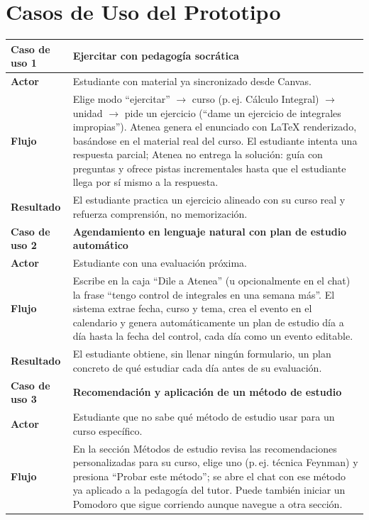 \documentclass[11pt,a4paper]{article}
\begin{document}
\section{Casos de Uso del Prototipo}

\begin{longtable}{@{}>{\bfseries}p{3.6cm} p{11cm}@{}}
\toprule
\textbf{Caso de uso 1} & \textbf{Ejercitar con pedagog\'ia socr\'atica} \\
\midrule
Actor & Estudiante con material ya sincronizado desde Canvas. \\
Flujo & Elige modo ``ejercitar'' $\rightarrow$ curso (p.\,ej. C\'alculo Integral) $\rightarrow$ unidad $\rightarrow$ pide un ejercicio (``dame un ejercicio de integrales impropias''). Atenea genera el enunciado con LaTeX renderizado, bas\'andose en el material real del curso. El estudiante intenta una respuesta parcial; Atenea no entrega la soluci\'on: gu\'ia con preguntas y ofrece pistas incrementales hasta que el estudiante llega por s\'i mismo a la respuesta. \\
Resultado & El estudiante practica un ejercicio alineado con su curso real y refuerza comprensi\'on, no memorizaci\'on. \\
\midrule
\textbf{Caso de uso 2} & \textbf{Agendamiento en lenguaje natural con plan de estudio autom\'atico} \\
\midrule
Actor & Estudiante con una evaluaci\'on pr\'oxima. \\
Flujo & Escribe en la caja ``Dile a Atenea'' (u opcionalmente en el chat) la frase ``tengo control de integrales en una semana m\'as''. El sistema extrae fecha, curso y tema, crea el evento en el calendario y genera autom\'aticamente un plan de estudio d\'ia a d\'ia hasta la fecha del control, cada d\'ia como un evento editable. \\
Resultado & El estudiante obtiene, sin llenar ning\'un formulario, un plan concreto de qu\'e estudiar cada d\'ia antes de su evaluaci\'on. \\
\midrule
\textbf{Caso de uso 3} & \textbf{Recomendaci\'on y aplicaci\'on de un m\'etodo de estudio} \\
\midrule
Actor & Estudiante que no sabe qu\'e m\'etodo de estudio usar para un curso espec\'ifico. \\
Flujo & En la secci\'on M\'etodos de estudio revisa las recomendaciones personalizadas para su curso, elige uno (p.\,ej. t\'ecnica Feynman) y presiona ``Probar este m\'etodo''; se abre el chat con ese m\'etodo ya aplicado a la pedagog\'ia del tutor. Puede tambi\'en iniciar un Pomodoro que sigue corriendo aunque navegue a otra secci\'on. \\

\end{longtable}
\end{document}
